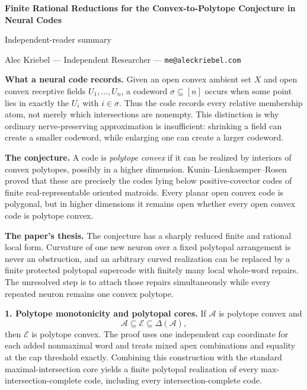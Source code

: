 \documentclass[10pt]{article}
\begin{document}
\begin{center}
{\Large\bfseries Finite Rational Reductions for the Convex-to-Polytope Conjecture in Neural Codes}\par
\vspace{2mm}
{\large Independent-reader summary}\par
\vspace{1mm}
Alec Kriebel --- Independent Researcher --- \texttt{me@aleckriebel.com}
\end{center}

\textbf{What a neural code records.}
Given an open convex ambient set $X$ and open convex receptive fields $U_1,\ldots,U_n$, a codeword $\sigma\subseteq[n]$ occurs when some point lies in exactly the $U_i$ with $i\in\sigma$.  Thus the code records every relative membership atom, not merely which intersections are nonempty.  This distinction is why ordinary nerve-preserving approximation is insufficient: shrinking a field can create a smaller codeword, while enlarging one can create a larger codeword.

\textbf{The conjecture.}
A code is \emph{polytope convex} if it can be realized by interiors of convex polytopes, possibly in a higher dimension.  Kunin--Lienkaemper--Rosen proved that these are precisely the codes lying below positive-covector codes of finite real-representable oriented matroids.  Every planar open convex code is polygonal, but in higher dimensions it remains open whether every open convex code is polytope convex.

\textbf{The paper's thesis.}
The conjecture has a sharply reduced finite and rational local form.  Curvature of one new neuron over a fixed polytopal arrangement is never an obstruction, and an arbitrary curved realization can be replaced by a finite protected polytopal supercode with finitely many local whole-word repairs.  The unresolved step is to attach those repairs simultaneously while every repeated neuron remains one convex polytope.

\textbf{1. Polytope monotonicity and polytopal cores.}
If $\mathcal A$ is polytope convex and
\[
 \mathcal A\subseteq\mathcal E\subseteq\Delta(\mathcal A),
\]
then $\mathcal E$ is polytope convex.  The proof uses one independent cap coordinate for each added nonmaximal word and treats mixed apex combinations and equality at the cap threshold exactly.  Combining this construction with the standard maximal-intersection core yields a finite polytopal realization of every max-intersection-complete code, including every intersection-complete code.
\end{document}
